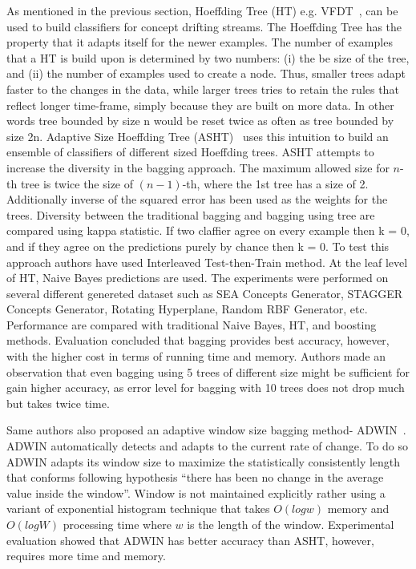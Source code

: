 As mentioned in the previous section, Hoeffding Tree (HT) e.g. VFDT~\cite{domingos00:vfdt}, can be used to build classifiers for concept drifting streams. The Hoeffding Tree has the property that it adapts itself for the newer examples. The number of examples that a HT is build upon is determined by two numbers: (i) the be size of the tree, and (ii) the number of examples used to create a node. Thus, smaller trees adapt faster to the changes in the data, while larger trees tries to retain the rules that reflect longer time-frame, simply because they are built on more data. In other words tree bounded by size n would be reset twice as often as tree bounded by size 2n. Adaptive Size Hoeffding Tree (ASHT)~\cite{bifet09:asht} uses this intuition to build an ensemble of classifiers of different sized Hoeffding trees. ASHT attempts to increase the diversity in the bagging approach. The maximum allowed size for $n$-th tree is twice the size of $(n-1)$-th, where the 1st tree has a size of 2. Additionally inverse of the squared error has been used as the weights for the trees. Diversity between the traditional bagging and bagging using tree are compared using kappa statistic. If two claffier agree on every example then k = 0, and if they agree on the predictions purely by chance then k = 0. To test this approach authors have used Interleaved Test-then-Train method. At the leaf level of HT, Naive Bayes predictions are used. The experiments were performed on several different genereted dataset such as SEA Concepts Generator, STAGGER Concepts Generator, Rotating Hyperplane, Random RBF Generator, etc. Performance are compared with traditional Naive Bayes, HT, and boosting methods. Evaluation concluded that bagging provides best accuracy, however, with the higher cost in terms of running time and memory. Authors made an observation that even bagging using 5 trees of different size might be sufficient for gain higher accuracy, as error level for bagging with 10 trees does not drop much but takes twice time.

Same authors also proposed an adaptive window size bagging method- ADWIN~\cite{bifet09:asht}. ADWIN automatically detects and adapts to the current rate of change. To do so ADWIN adapts its window size to maximize the statistically consistently length that conforms following hypothesis ``there has been no change in the average value inside the window''. Window is not maintained explicitly rather using a variant of exponential histogram technique that takes $O(log w)$ memory and $O(log W)$ processing time where $w$ is the length of the window. Experimental evaluation showed that ADWIN has better accuracy than ASHT, however, requires more time and memory. 

